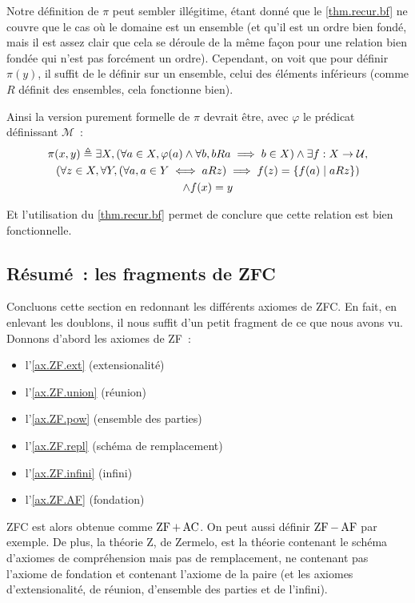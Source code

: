 \begin{remark}
  Notre définition de $\pi$ peut sembler illégitime, étant donné que le
  \cref{thm.recur.bf} ne couvre que le cas où le domaine est un ensemble (et
  qu'il est un ordre bien fondé, mais il est assez clair que cela se déroule de
  la même façon pour une relation bien fondée qui n'est pas forcément un ordre).
  Cependant, on voit que pour définir $\pi(y)$, il suffit de le définir sur
  un ensemble, celui des éléments inférieurs (comme $R$ définit des ensembles,
  cela fonctionne bien).

  Ainsi la version purement formelle de $\pi$ devrait être, avec $\varphi$ le
  prédicat définissant $\mathcal M$~:
  \begin{multline*}
    \pi(x,y) \triangleq \exists X,
    (\forall a \in X, \varphi(a) \land \forall b, b R a \implies b \in X)
    \land \exists f : X \to \mathcal U, \\(\forall z\in X,
    \forall Y, (\forall a, a \in Y \iff a R z) \implies
    f(z) = \{f(a) \mid a R z\})\\
    \land f(x) = y
  \end{multline*}

  Et l'utilisation du \cref{thm.recur.bf} permet de conclure que cette relation
  est bien fonctionnelle.
\end{remark}

\subsection{Résumé~: les fragments de ZFC}

Concluons cette section en redonnant les différents axiomes de ZFC. En fait,
en enlevant les doublons, il nous suffit d'un petit fragment de ce que nous
avons vu. Donnons d'abord les axiomes de ZF~:
\begin{itemize}
\item l'\cref{ax.ZF.ext} (extensionalité)
\item l'\cref{ax.ZF.union} (réunion)
\item l'\cref{ax.ZF.pow} (ensemble des parties)
\item l'\cref{ax.ZF.repl} (schéma de remplacement)
\item l'\cref{ax.ZF.infini} (infini)
\item l'\cref{ax.ZF.AF} (fondation)
\end{itemize}
ZFC est alors obtenue comme $\operatorname{ZF} + \operatorname{AC}$. On peut aussi définir
$\operatorname{ZF} - \operatorname{AF}$ par exemple. De plus, la théorie $\mathrm Z$, de Zermelo, est la
théorie contenant le schéma d'axiomes de compréhension mais pas de remplacement,
ne contenant pas l'axiome de fondation et contenant l'axiome de la paire (et les
axiomes d'extensionalité, de réunion, d'ensemble des parties et de l'infini).

